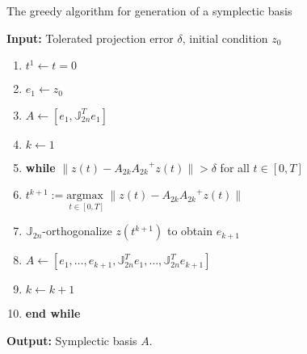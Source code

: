 \begin{algorithm} 
\caption{The greedy algorithm for generation of a symplectic basis} \label{alg:added1}
{\bf Input:} Tolerated projection error $\delta$, initial condition $ z_0$
\begin{enumerate}
\item $t^1 \leftarrow t=0$
\item $e_1 \leftarrow z_0$
\item $A \leftarrow [e_1,\mathbb J^T_{2n}e_1]$
\item $k \leftarrow 1$
\item \textbf{while} $\| z(t) - A_{2k}{A_{2k}}^+z(t) \| > \delta$ for all $t \in [0,T]$
\item \hspace{0.5cm} $t^{k+1} := \underset{t\in [0,T]}{\text{argmax }} \| z(t) - A_{2k}{A_{2k}}^+z(t) \|$
\item \hspace{0.5cm} $\mathbb J_{2n}$-orthogonalize $ z(t^{k+1})$ to obtain $e_{k+1}$
\item \hspace{0.5cm} $A \leftarrow [e_1,\dots ,e_{k+1} , \mathbb J^T_{2n}e_1,\dots,\mathbb J^T_{2n}e_{k+1}]$
\item \hspace{0.5cm} $k \leftarrow k+1$
\item \textbf{end while}
\end{enumerate}
\vspace{0.5cm}
{\bf Output:} Symplectic basis $A$.
\end{algorithm}


